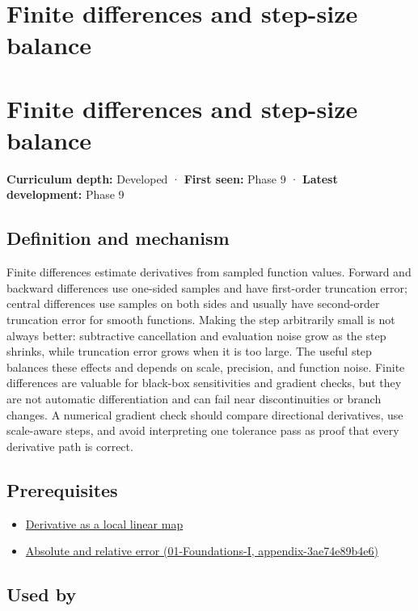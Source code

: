 \hypertarget{appendix-e2d7b4f2161d}{}
\section*{Finite differences and step-size balance}
\section{Finite differences and step-size balance}\label{finite-differences-and-step-size-balance}

\textbf{Curriculum depth:} Developed · \textbf{First seen:} Phase 9 · \textbf{Latest development:} Phase 9

\subsection{Definition and mechanism}\label{definition-and-mechanism}

Finite differences estimate derivatives from sampled function values. Forward and backward differences use one-sided samples and have first-order truncation error; central differences use samples on both sides and usually have second-order truncation error for smooth functions. Making the step arbitrarily small is not always better: subtractive cancellation and evaluation noise grow as the step shrinks, while truncation error grows when it is too large. The useful step balances these effects and depends on scale, precision, and function noise. Finite differences are valuable for black-box sensitivities and gradient checks, but they are not automatic differentiation and can fail near discontinuities or branch changes. A numerical gradient check should compare directional derivatives, use scale-aware steps, and avoid interpreting one tolerance pass as proof that every derivative path is correct.

\subsection{Prerequisites}\label{prerequisites}

\begin{itemize}
\tightlist
\item
  \hyperref[appendix-7bc181935c42]{Derivative as a local linear map}
\item
  \href{}{Absolute and relative error (01-Foundations-I, appendix-3ae74e89b4e6)}
\end{itemize}

\subsection{Used by}\label{used-by}

